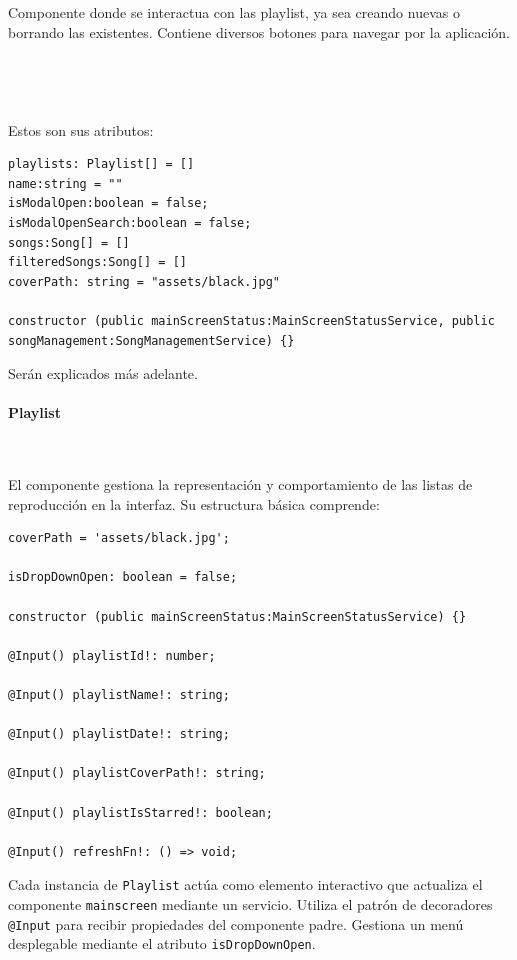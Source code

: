 \documentclass[11pt, a4paper]{article}
\begin{document}
            Componente donde se interactua con las playlist, ya sea creando nuevas o borrando las existentes. Contiene diversos botones para navegar por la aplicación. \\ \\ \\ \\ \\

            Estos son sus atributos:

            \begin{lstlisting}[caption={Atributos Y Constructora Sidebar}]
playlists: Playlist[] = []
name:string = ""
isModalOpen:boolean = false;
isModalOpenSearch:boolean = false;
songs:Song[] = []
filteredSongs:Song[] = []
coverPath: string = "assets/black.jpg"

constructor (public mainScreenStatus:MainScreenStatusService, public songManagement:SongManagementService) {}
            \end{lstlisting}

            Serán explicados más adelante.

                \paragraph{Playlist}
                ‎ 

                El componente gestiona la representación y comportamiento de las listas de reproducción en la interfaz. Su estructura básica comprende:

                \begin{lstlisting}[caption={Atributos y Constructora Playlist}]
coverPath = 'assets/black.jpg';

isDropDownOpen: boolean = false;

constructor (public mainScreenStatus:MainScreenStatusService) {}

@Input() playlistId!: number;

@Input() playlistName!: string;

@Input() playlistDate!: string;

@Input() playlistCoverPath!: string;

@Input() playlistIsStarred!: boolean;

@Input() refreshFn!: () => void;
                \end{lstlisting}

                Cada instancia de \texttt{Playlist} actúa como elemento interactivo que actualiza el componente \texttt{mainscreen} mediante un servicio. Utiliza el patrón de decoradores \texttt{@Input} para recibir propiedades del componente padre. Gestiona un menú desplegable mediante el atributo \texttt{isDropDownOpen}.
                
\end{document}
